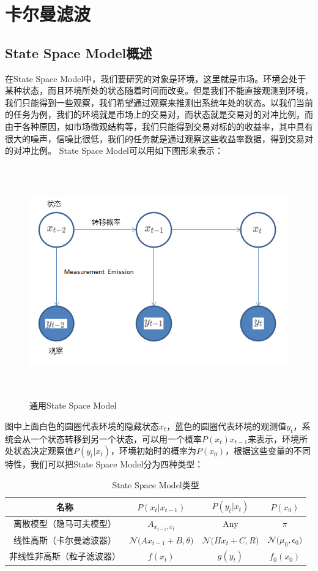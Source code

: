 \documentclass{article}
\begin{document}
\section{卡尔曼滤波}
\subsection{State Space Model概述}
在State Space Model中，我们要研究的对象是环境，这里就是市场。环境会处于某种状态，而且环境所处的状态随着时间而改变。但是我们不能直接观测到环境，我们只能得到一些观察，我们希望通过观察来推测出系统年处的状态。以我们当前的任务为例，我们的环境就是市场上的交易对，而状态就是交易对的对冲比例，而由于各种原因，如市场微观结构等，我们只能得到交易对标的的收益率，其中具有很大的噪声，信噪比很低，我们的任务就是通过观察这些收益率数据，得到交易对的对冲比例。
State Space Model可以用如下图形来表示：
\begin{figure}[H]
	\caption{通用State Space Model}
	\label{f000054}
	\centering
	\includegraphics[height=10cm]{images/f000054}
\end{figure}
图中上面白色的圆圈代表环境的隐藏状态$x_{t}$，蓝色的圆圈代表环境的观测值$y_{t}$，系统会从一个状态转移到另一个状态，可以用一个概率$P(x_{t})x_{t-1}$来表示，环境所处状态决定观察值$P(y_{t} \vert x_{t})$，环境初始时的概率为$P(x_{0})$，根据这些变量的不同特性，我们可以把State Space Model分为四种类型：
\begin{table}[H]
\caption{State Space Model类型}
\label{t000001}
\begin{tabular}{|c|c|c|c|} \hline
名称 & $P(x_{t} \vert x_{t-1})$ & $P(y_{t} \vert x_{t})$ & $P(x_{0})$ \\ \hline  
离散模型（隐马可夫模型） & $A_{x_{t-1}, x_{t}}$ & Any & $\pi$ \\ \hline
线性高斯（卡尔曼滤波器） & $\mathcal{N}\big(  Ax_{t-1}+B, \theta \big)$ & $\mathcal{N}\big(  Hx_{t}+C, R \big)$ & $\mathcal{N}\big(  \mu _{0}, \epsilon _{0} \big)$ \\ \hline
非线性非高斯（粒子滤波器） & $f(x_{t})$ & $g(y_{t})$ & $f_{0}(x_{0})$\\ \hline
\end{tabular}
\end{table}
\end{document}
